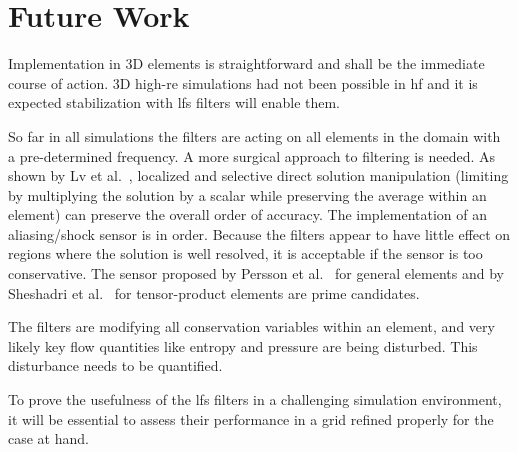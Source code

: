 \section{Future Work}
\label{sec:future_work}
Implementation in 3D elements is straightforward and shall be the immediate course of action. 3D high-\gls{re} simulations had not been possible in \gls{hf} and it is expected stabilization with \gls{lfs} filters will enable them.

So far in all simulations the filters are acting on all elements in the domain with a pre-determined frequency. A more surgical approach to filtering is needed. As shown by Lv et al.~\cite{lv2015entropy}, localized and selective direct solution manipulation (limiting by multiplying the solution by a scalar while preserving the average within an element) can preserve the overall order of accuracy. The implementation of an aliasing/shock sensor is in order. Because the filters appear to have little effect on regions where the solution is well resolved, it is acceptable if the sensor is too conservative. The sensor proposed by Persson et al.~\cite{persson2006sub} for general elements and by Sheshadri et al.~\cite{Sheshadri2014} for tensor-product elements are prime candidates.

The filters are modifying all conservation variables within an element, and very likely key flow quantities like entropy and pressure are being disturbed. This disturbance needs to be quantified.

To prove the usefulness of the \gls{lfs} filters in a challenging simulation environment, it will be essential to assess their performance in a grid refined properly for the case at hand.
